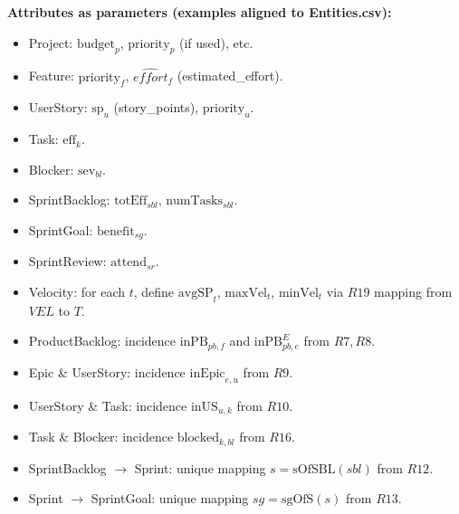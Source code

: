 \documentclass[11pt,a4paper]{article}
\begin{document}
\medskip
\noindent \textbf{Attributes as parameters (examples aligned to Entities.csv):}
\begin{itemize}
  \item Project: $\text{budget}_p$, $\text{priority}_p$ (if used), etc.
  \item Feature: $\text{priority}_f$, $\widehat{effort}_f$ (estimated\_effort).
  \item UserStory: $\text{sp}_u$ (story\_points), $\text{priority}_u$.
  \item Task: $\text{eff}_k$.
  \item Blocker: $\text{sev}_{bl}$.
  \item SprintBacklog: $\text{totEff}_{sbl}$, $\text{numTasks}_{sbl}$.
  \item SprintGoal: $\text{benefit}_{sg}$.
  \item SprintReview: $\text{attend}_{sr}$.
  \item Velocity: for each $t$, define $\text{avgSP}_t$, $\text{maxVel}_t$, $\text{minVel}_t$ via $R19$ mapping from $VEL$ to $T$.
  \item ProductBacklog: incidence $\text{inPB}_{pb,f}$ and $\text{inPB}^{E}_{pb,e}$ from $R7,R8$.
  \item Epic \& UserStory: incidence $\text{inEpic}_{e,u}$ from $R9$.
  \item UserStory \& Task: incidence $\text{inUS}_{u,k}$ from $R10$.
  \item Task \& Blocker: incidence $\text{blocked}_{k,bl}$ from $R16$.
  \item SprintBacklog $\rightarrow$ Sprint: unique mapping $s=\text{sOfSBL}(sbl)$ from $R12$.
  \item Sprint $\rightarrow$ SprintGoal: unique mapping $sg=\text{sgOfS}(s)$ from $R13$.
\end{itemize}
\end{document}
